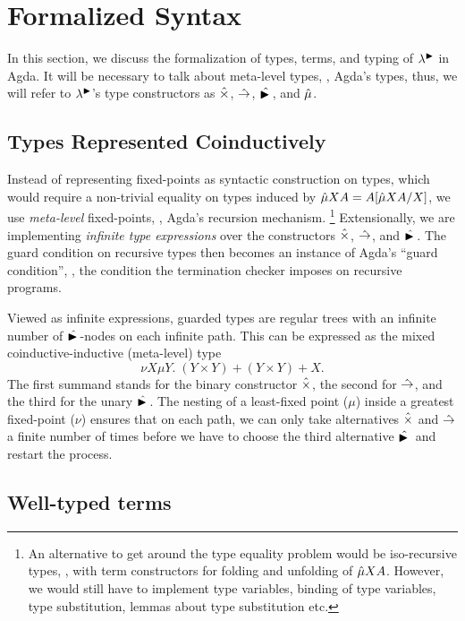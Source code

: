 
\section{Formalized Syntax}
\label{sec:syntax}

In this section, we discuss the formalization of types, terms, and
typing of $\lambda^{\mathord{\blacktriangleright}}$ in Agda.  It will be necessary to talk about
meta-level types, \ie, Agda's types, thus, we will refer to
$\lambda^{\mathord{\blacktriangleright}}$'s type constructors as $\hattimes$, $\hatto$,
$\hatlater$, and $\hatmu$.

\subsection{Types Represented Coinductively}

Instead of representing fixed-points as syntactic construction on
types, which would require a non-trivial equality on types induced by
$\hatmu X A = \subst{\hatmu X A}X A$, we use \emph{meta-level} fixed-points,
\ie, Agda's recursion mechanism.  \footnote{
An alternative to get around the type equality problem would be
iso-recursive types, \ie, with term constructors for folding and
unfolding of $\hatmu X A$.  However, we would still have to implement
type variables, binding of type variables, type substitution, lemmas
about type substitution etc.
}
Extensionally, we are implementing
\emph{infinite type expressions} over the constructors $\hattimes$,
$\hatto$, and $\hatlater$.  The guard condition on recursive types then
becomes an instance of Agda's ``guard condition'', \ie, the condition
the termination checker imposes on recursive programs.

Viewed as infinite expressions, guarded types are regular trees with
an infinite number of $\hatlater$-nodes on each infinite path.  This
can be expressed as the mixed coinductive-inductive (meta-level) type
\[
  \nu X \mu Y.\; (Y \times Y) + (Y \times Y) + X.
\]
The first summand stands for the binary constructor $\hattimes$, the
second for $\hatto$, and the third for the unary $\hatlater$.  The
nesting of a least-fixed point ($\mu$) inside a greatest fixed-point
($\nu$) ensures that on each path, we can only take alternatives
$\hattimes$ and $\hatto$ a finite number of times before we have to
choose the third alternative $\hatlater$ and restart the process.




\subsection{Well-typed terms}

